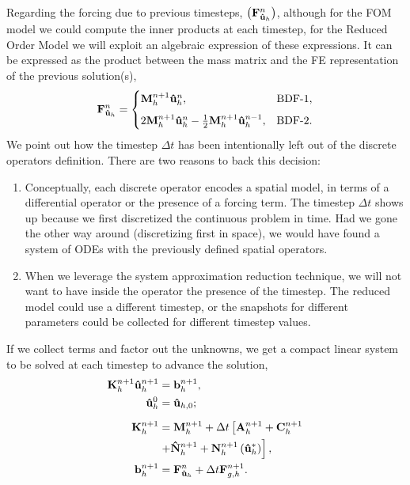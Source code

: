 \documentclass[../../thesis.tex]{subfiles}
\newcommand{\dt}{\ensuremath{\Delta t}}
\newcommand{\Ah}[1]{\ensuremath{\vb{#1}^{n+1}_h}}
\begin{document}
Regarding the forcing due to previous timesteps, $\left(\vb{F}_{\vb{\hat{u}}_h}^{n}\right)$, 
although for the FOM model we could compute the inner products at each timestep, 
for the Reduced Order Model we will exploit an algebraic expression of these expressions.
It can be expressed as the product between the mass matrix and the FE representation of the previous solution(s), 
\begin{equation}
    \label{eq:1d_fom_forcing_term_time_mass_matrix}
    \vb{F}_{\vb{\hat{u}}_h}^{n}= 
    \begin{cases}
        \vb{M}_{h}^{n+1} \vb{\hat{u}}_{h}^{n},                &\text{BDF-1},
        \\[2mm]
        2\vb{M}_{h}^{n+1} \vb{\hat{u}}_{h}^{n}
        - \frac{1}{2}\vb{M}_{h}^{n+1} \vb{\hat{u}}_{h}^{n-1}, &\text{BDF-2}.
    \end{cases}
\end{equation}
We point out how the timestep $\dt$ has been intentionally left out of the discrete operators definition.
There are two reasons to back this decision:
\begin{enumerate}
    \item Conceptually, each discrete operator encodes a spatial model, 
    in terms of a differential operator or the presence of a forcing term.
    The timestep $\dt$ shows up because we first discretized the continuous problem in time. 
    Had we gone the other way around (discretizing first in space), 
    we would have found a system of ODEs with the previously defined spatial operators. 
    \item When we leverage the system approximation reduction technique, 
    we will not want to have inside the operator the presence of the timestep.
    The reduced model could use a different timestep, 
    or the snapshots for different parameters could be collected for different timestep values.
\end{enumerate}

If we collect terms and factor out the unknowns, we get a compact linear system to be solved at each timestep to advance the solution,
\begin{subequations}
    \begin{align}
        \label{eq:1d_fom_linear_system_timestep}
        \vb{K}_h^{n+1} \vb{\hat{u}}_h^{n+1} &= \vb{b}_h^{n+1}, 
        \\
        \vb{\hat{u}}_h^{0} &= \vb{\hat{u}}_{h,0};
        \\[2mm]
        \vb{K}_h^{n+1} &= \Ah{M} + \dt \left[\Ah{A} + \Ah{C} \right. 
        \nonumber 
        \\
                        &\left. + \Ah{\hat{N}} + \Ah{N}\left(\vb{\hat{u}}_{h}^{*}\right)\right],
        \\
        \vb{b}_h^{n+1} &= \vb{F}_{\vb{\hat{u}}_h}^{n} + \dt \vb{F}_{g,h}^{n+1}.
    \end{align}
\end{subequations}
\end{document}
